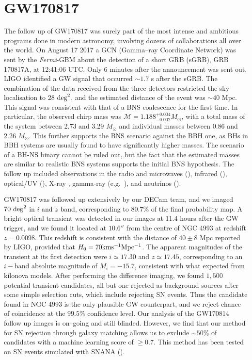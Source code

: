 \section{GW170817}
The follow up of GW170817 was surely part of the most intense and ambitious programs done in modern astronomy, involving dozens of collaborations all over the world.
On August 17 2017 a GCN (Gamma--ray Coordinate Network) was sent by the \emph{Fermi}-GBM about the detection of a short GRB (sGRB), GRB 170817A, at 12:41:06 UTC. Only 6 minutes after the announcement was sent out, LIGO identified a GW signal that occurred $\sim 1.7$ s after the sGRB. The combination of the data received from the three detectors restricted the sky localisation to 28 ${\rm deg}^2$, and the estimated distance of the event was $\sim 40$ Mpc.
This signal was consistent with that of a BNS coalescence for the first time. In particular, the observed chirp mass was $\mathcal{M}=1.188^{+0.004}_{-0.002} M_\odot$, with a total mass of the system between 2.73 and 3.29 $M_\odot$ and individual masses between 0.86 and 2.26 $M_\odot$. This further supports the BNS scenario against the BBH one, as BHs in BBH systems are usually found to have significantly higher masses. The scenario of a BH-NS binary cannot be ruled out, but the fact that the estimated masses are similar to realistic BNS systems supports the initial BNS hypothesis. 
The follow up included observations in the radio and microwaves (\citealt{Hallinan+17,Alexander+17}), infrared (\citealt{Chornock+17,Kasliwal+17}), optical/UV (\citealt{Arcavi+17,Cowperthwaite,Evans+17,Kilpatrick+17,Lipunov+17,McCully+17,Pian+17,Smartt+17,Shappee+17,marcelle17,Tanvir+17}), X-ray \citep{Troja+17,Margutti+17,Haggard+17,Fong+17},  gamma-ray (e.g.~\citealt{Goldstein+17,Savchenko+17,LIGO+Fermi}), and neutrinos (\citealt{NEUTRINOS}).

GW170817 was followed up extensively by our DECam team, and we imaged $70~{\rm deg}^2$ in $i$ and $z$ band, corresponding to $80.7\%$ of the final probability map. A bright optical transient was detected in our images at 11.4 hours after the GW trigger, and we found it located at $10.6''$ from the centre of NGC 4993 at redshift $z = 0.0098$. This redshift is consistent with the distance of $40\pm8$ Mpc reported by LIGO, provided that $H_0 = 70 {\rm km s^{-1} Mpc^{-1}}$. The apparent magnitudes of the transient at its first detection were $i\simeq 17.30$ and $z\simeq 17.45$, corresponding to an $i-$band absolute magnitude of $M_i=-15.7$, consistent with what expected from kilonova models. After performing the difference imaging, we found $1,500$ potential transient candidates, all but one rejected as background sources after some simple selection cuts, which include rejecting SN events. Thus the candidate found in NGC 4993 is the only plausible GW counterpart, and we reject chance of coincidence at the $99.5\%$ confidence level. Our analysis of the GW170814 follow up images is on--going and still blinded. However, we find that our method for SN rejection through galaxy matching allows us to exclude $\sim 50\%$ of candidates with a machine learning score of $\geq 0.7$. This method has been tested on SN events simulated with \textsc{SNANA} (\citealt{snana}).


